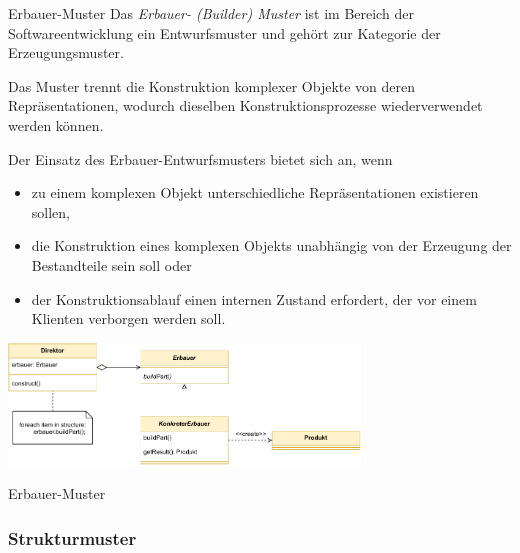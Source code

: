\begin{defi}{Erbauer-Muster}
    Das \emph{Erbauer- (Builder) Muster} ist im Bereich der Softwareentwicklung ein Entwurfsmuster und gehört zur Kategorie der Erzeugungsmuster.

    Das Muster trennt die Konstruktion komplexer Objekte von deren Repräsentationen, wodurch dieselben Konstruktionsprozesse wiederverwendet werden können.

    Der Einsatz des Erbauer-Entwurfsmusters bietet sich an, wenn
    \begin{itemize}
        \item zu einem komplexen Objekt unterschiedliche Repräsentationen existieren sollen,
        \item die Konstruktion eines komplexen Objekts unabhängig von der Erzeugung der Bestandteile sein soll oder
        \item der Konstruktionsablauf einen internen Zustand erfordert, der vor einem Klienten verborgen werden soll.
    \end{itemize}

    \begin{center}
        \includegraphics[width=0.7\textwidth]{includes/figures/defi_erbauer.pdf}
    \end{center}
\end{defi}


\begin{example}{Erbauer-Muster}

    

    
\end{example}

\subsubsection{Strukturmuster}

